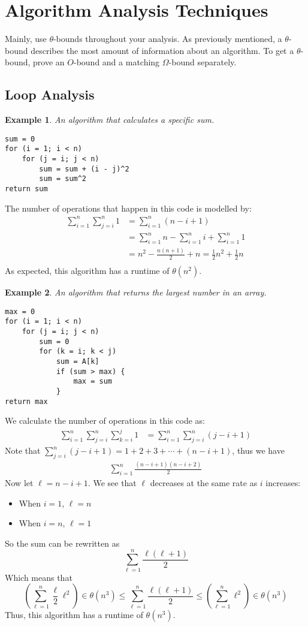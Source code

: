 \documentclass{report}
\newtheorem{ex}{Example}[section]
\begin{document}
\section{Algorithm Analysis Techniques}
Mainly, use $\theta$-bounds throughout your analysis. As previously mentioned, a $\theta$-bound describes the most amount of information about an algorithm. To get a $\theta$-bound, prove an $O$-bound and a matching $\Omega$-bound separately.
\subsection{Loop Analysis}
\begin{ex}
An algorithm that calculates a specific sum.
\end{ex}
\begin{lstlisting}
sum = 0
for (i = 1; i < n)
	for (j = i; j < n)
		sum = sum + (i - j)^2
		sum = sum^2
return sum
\end{lstlisting}
The number of operations that happen in this code is modelled by:
\begin{align}
\sum_{i = 1}^n \sum_{j = i}^n 1 &= \sum_{i=1}^n (n - i + 1) \\
&= \sum_{i = 1}^n n - \sum_{i = 1}^n i + \sum_{i = 1}^n 1\\
&= n^2 - \frac{n(n+1)}{2} + n = \frac{1}{2}n^2 + \frac{1}{2}n\\
\end{align}
As expected, this algorithm has a runtime of $\theta(n^2)$.

\begin{ex}
An algorithm that returns the largest number in an array.
\end{ex}
\begin{lstlisting}
max = 0
for (i = 1; i < n)
	for (j = i; j < n)
		sum = 0
		for (k = i; k < j)
			sum = A[k]
			if (sum > max) {
				max = sum
			}
return max
\end{lstlisting}
We calculate the number of operations in this code as:
\begin{align}
\sum_{i = 1}^n \sum_{j = i}^n \sum_{k = i}^j 1 &= \sum_{i = 1}^n \sum_{j = i}^n (j - i + 1)
\end{align}
Note that $\displaystyle \sum_{j = i}^n (j - i + 1) = 1 + 2 + 3 + \cdots + (n-i + 1)$, thus we have
\begin{align}
\sum_{i=1}^n \frac{(n-i+1)(n-i+2)}{2}
\end{align}
Now let $\ell = n-i+1$. We see that $\ell$ decreases at the same rate as $i$ increases:
\begin{itemize}
\item When $i = 1$,  $\ell = n$
\item When $i = n$,  $\ell = 1$
\end{itemize}
So the sum can be rewritten as
$$\sum_{\ell=1}^n \frac{\ell(\ell+1)}{2}$$
Which means that
$$\left(\sum_{\ell=1}^n \frac{\ell}{2}\ell^2\right) \in \theta(n^3) \leq  \sum_{\ell=1}^n \frac{\ell(\ell+1)}{2} \leq \left(\sum_{\ell=1}^n \ell^2\right) \in \theta(n^3)$$
Thus, this algorithm has a runtime of $\theta(n^3)$.
\end{document}
